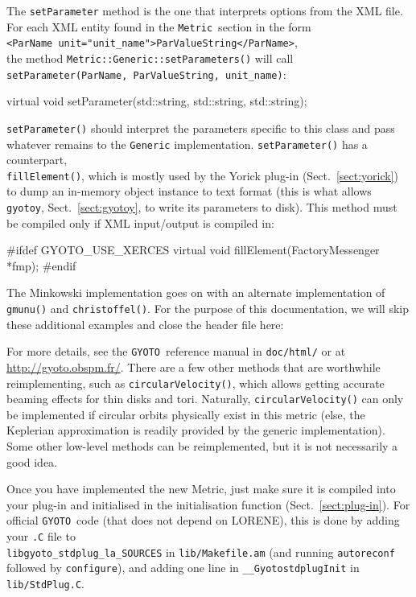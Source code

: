 \documentclass[a4paper,12pt]{article}
\newcommand{\GYOTO}{\texttt{GYOTO}}
\newcommand{\Metric}{\texttt{Metric}}
\begin{document}
The \texttt{setParameter} method is the one that interprets options
from the XML file. For each XML entity found in the \Metric\ section
in the form\\
\texttt{<ParName unit="unit\_name">ParValueString</ParName>},\\
 the method
\texttt{Metric::Generic::setParameters()} will call\\
\texttt{setParameter(ParName, ParValueString, unit\_name)}:
\begin{code}
    virtual void setParameter(std::string, std::string, std::string);
\end{code}
\texttt{setParameter()} should interpret the parameters specific to
this class and pass whatever remains to the \texttt{Generic}
implementation. \texttt{setParameter()} has a counterpart,\\
\texttt{fillElement()}, which is mostly used by the Yorick plug-in
(Sect.~\ref{sect:yorick}) to dump an in-memory object instance to text
format (this is what allows \texttt{gyotoy}, Sect.~\ref{sect:gyotoy},
to write its parameters to disk). This method must be compiled only if
XML input/output is compiled in:
\begin{code}
  #ifdef GYOTO_USE_XERCES
    virtual void fillElement(FactoryMessenger *fmp);
  #endif
\end{code}
The Minkowski implementation goes on with an alternate implementation
of \texttt{gmunu()} and \texttt{christoffel()}. For the purpose of
this documentation, we will skip these additional examples and close
the header file here:
\begin{code}
  };
  #endif
\end{code}

For more details, see the \GYOTO\ reference manual in
\texttt{doc/html/} or at \url{http://gyoto.obspm.fr/}. There are a few
other methods that are worthwhile reimplementing, such as
\texttt{circularVelocity()}, which allows getting accurate beaming
effects for thin disks and tori. Naturally,
\texttt{circularVelocity()} can only be implemented if circular orbits
physically exist in this metric (else, the Keplerian approximation is
readily provided by the generic implementation). Some other low-level
methods can be reimplemented, but it is not necessarily a good idea.

Once you have implemented the new Metric, just make sure it is
compiled into your plug-in and initialised in the initialisation
function (Sect.~\ref{sect:plug-in}). For official \GYOTO\ code (that
does not depend on LORENE), this is done by adding your \texttt{.C}
file to\\
\texttt{libgyoto\_stdplug\_la\_SOURCES} in
\texttt{lib/Makefile.am} (and running \texttt{autoreconf} followed by
\texttt{configure}), and adding one line in
\texttt{\_\_GyotostdplugInit} in \texttt{lib/StdPlug.C}.
\end{document}
